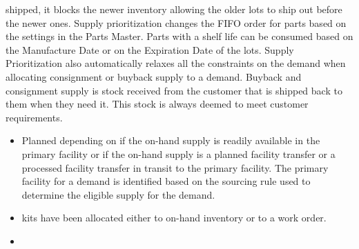 \documentclass[letterpaper,10pt,english]{sphinxmanual}
\begin{document}
shipped,
\textbar{} it blocks the newer inventory allowing the older lots to ship out
before
\textbar{} the newer ones. Supply prioritization changes the FIFO order for parts
\textbar{} based on the settings in the Parts Master. Parts with a shelf life can
\textbar{} be consumed based on the Manufacture Date or on the Expiration Date of
\textbar{} the lots. Supply Prioritization also automatically relaxes all the
\textbar{} constraints on the demand when allocating consignment or buyback
supply
\textbar{} to a demand. Buyback and consignment supply is stock received from the
\textbar{} customer that is shipped back to them when they need it. This stock is
\textbar{} always deemed to meet customer requirements.
\begin{itemize}
\item {} 

Planned
\textbar{} depending on if the on-hand supply is readily available in the
\textbar{} primary facility or if the on-hand supply is a planned facility
\textbar{} transfer or a processed facility transfer in transit to the primary
\textbar{} facility. The primary facility for a demand is identified based on
\textbar{} the sourcing rule used to determine the eligible supply for the
\textbar{} demand.

\item {} 

kits
\textbar{} have been allocated either to on-hand inventory or to a work order.

\item {} 


\end{itemize}
\end{document}
